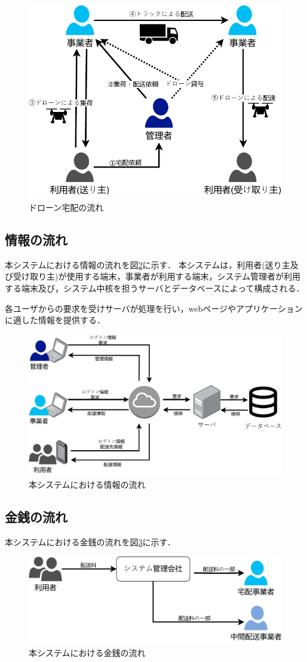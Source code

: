 \documentclass[a4paper, titlepage]{jsarticle}
\begin{document}
\begin{figure}[H]
  \centering
  \includegraphics[width=0.6\linewidth]{./overview_flow.pdf}
  \caption{ドローン宅配の流れ}
  \label{fig:overview_flow}
\end{figure}

\subsection{情報の流れ}
本システムにおける情報の流れを図\ref{fig:info_flow}に示す．
本システムは，利用者(送り主及び受け取り主)が使用する端末，事業者が利用する端末，システム管理者が利用する端末及び，システム中核を担うサーバとデータベースによって構成される．

各ユーザからの要求を受けサーバが処理を行い，webページやアプリケーションに適した情報を提供する．

\begin{figure}[H]
  \centering
  \includegraphics[width=0.6\linewidth]{./info_flow.pdf}
  \caption{本システムにおける情報の流れ}
  \label{fig:info_flow}
\end{figure}

\subsection{金銭の流れ}
本システムにおける金銭の流れを図\ref{fig:money_flow}に示す．

\begin{figure}[H]
  \centering
  \includegraphics[width=0.6\linewidth]{./money_flow.pdf}
  \caption{本システムにおける金銭の流れ}
  \label{fig:money_flow}
\end{figure}
\end{document}
